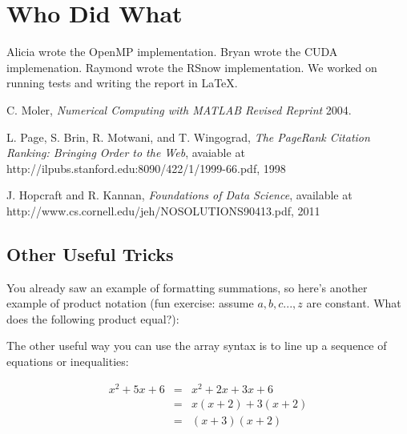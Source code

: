 \documentclass[11pt,letterpaper]{article}
\begin{document}
\section{Who Did What} \label{App:AppendixB}

Alicia wrote the OpenMP implementation. Bryan wrote the CUDA implemenation. Raymond wrote the RSnow implementation. We worked on running tests and writing the report in  \LaTeX.

\newpage

\begin{thebibliography}{1}

   C. Moler, {\em Numerical Computing with MATLAB Revised Reprint}  2004.

    L. Page, S. Brin, R. Motwani, and T. Wingograd, {\em The PageRank Citation Ranking: Bringing Order to the Web}, avaiable at http://ilpubs.stanford.edu:8090/422/1/1999-66.pdf,	1998

    J. Hopcraft and R. Kannan, {\em Foundations of Data Science}, available at http://www.cs.cornell.edu/jeh/NOSOLUTIONS90413.pdf, 2011

\end{thebibliography}

\iffalse
\subsection{Other Useful Tricks}
You already saw an example of formatting summations, so here's another example of product notation
(fun exercise: assume $a,b,c...,z$ are constant.  What does the following product equal?):

\pagebreak

The other useful way you can use the array syntax is to line up a sequence of equations or
inequalities:


\begin{eqnarray}
x^2 + 5x + 6 & = & x^2 + 2x + 3x + 6\\
& = & x(x + 2) + 3(x + 2)\label{eqn2}\\
& = & (x + 3)(x + 2)
\end{eqnarray}
\end{document}
